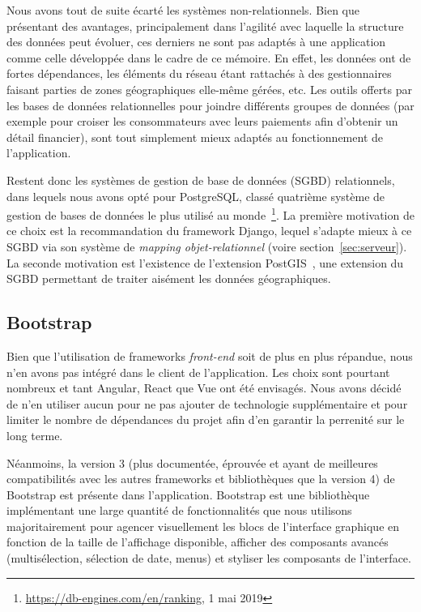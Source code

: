 \documentclass{EPL-master-thesis-covers-FR}
\begin{document}
				Nous avons tout de suite écarté les systèmes non-relationnels. Bien que présentant des avantages, principalement dans l'agilité avec laquelle la structure des données peut évoluer, ces derniers ne sont pas adaptés à une application comme celle développée dans le cadre de ce mémoire. En effet, les données ont de fortes dépendances, les éléments du réseau étant rattachés à des gestionnaires faisant parties de zones géographiques elle-même gérées, etc. Les outils offerts par les bases de données relationnelles pour joindre différents groupes de données (par exemple pour croiser les consommateurs avec leurs paiements afin d'obtenir un détail financier), sont tout simplement mieux adaptés au fonctionnement de l'application.

				Restent donc les systèmes de gestion de base de données (SGBD) relationnels, dans lequels nous avons opté pour PostgreSQL, classé quatrième système de gestion de bases de données le plus utilisé au monde~\footnote{\url{https://db-engines.com/en/ranking}, 1 mai 2019}. La première motivation de ce choix est la recommandation du framework Django, lequel s'adapte mieux à ce SGBD via son système de \emph{mapping objet-relationnel} (voire section~\ref{sec:serveur}). La seconde motivation est l'existence de l'extension PostGIS~\cite{ref:postgis}, une extension du SGBD permettant de traiter aisément les données géographiques.

			\subsection*{Bootstrap}

				Bien que l'utilisation de frameworks \emph{front-end} soit de plus en plus répandue, nous n'en avons pas intégré dans le client de l'application. Les choix sont pourtant nombreux et tant Angular, React que Vue ont été envisagés. Nous avons décidé de n'en utiliser aucun pour ne pas ajouter de technologie supplémentaire et pour limiter le nombre de dépendances du projet afin d'en garantir la perrenité sur le long terme.

				Néanmoins, la version 3 (plus documentée, éprouvée et ayant de meilleures compatibilités avec les autres frameworks et bibliothèques que la version 4) de Bootstrap est présente dans l'application. Bootstrap est une bibliothèque implémentant une large quantité de fonctionnalités que nous utilisons majoritairement pour agencer visuellement les blocs de l'interface graphique en fonction de la taille de l'affichage disponible, afficher des composants avancés (multisélection, sélection de date, menus) et styliser les composants de l'interface.
\end{document}
